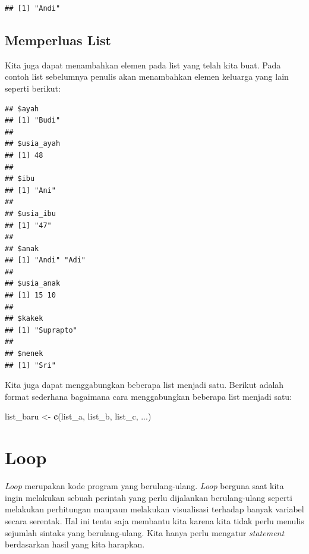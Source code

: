 \documentclass[]{book}
\newenvironment{Shaded}{\begin{snugshade}}{\end{snugshade}}
\newcommand{\KeywordTok}[1]{\textcolor[rgb]{0.13,0.29,0.53}{\textbf{#1}}}
\newcommand{\StringTok}[1]{\textcolor[rgb]{0.31,0.60,0.02}{#1}}
\newcommand{\CommentTok}[1]{\textcolor[rgb]{0.56,0.35,0.01}{\textit{#1}}}
\newcommand{\OperatorTok}[1]{\textcolor[rgb]{0.81,0.36,0.00}{\textbf{#1}}}
\newcommand{\NormalTok}[1]{#1}
\begin{document}
\begin{verbatim}
## [1] "Andi"
\end{verbatim}

\subsection{Memperluas List}\label{memperluas-list}

Kita juga dapat menambahkan elemen pada list yang telah kita buat. Pada
contoh list sebelumnya penulis akan menambahkan elemen keluarga yang
lain seperti berikut:

\begin{Shaded}
\end{Shaded}

\begin{verbatim}
## $ayah
## [1] "Budi"
## 
## $usia_ayah
## [1] 48
## 
## $ibu
## [1] "Ani"
## 
## $usia_ibu
## [1] "47"
## 
## $anak
## [1] "Andi" "Adi" 
## 
## $usia_anak
## [1] 15 10
## 
## $kakek
## [1] "Suprapto"
## 
## $nenek
## [1] "Sri"
\end{verbatim}

Kita juga dapat menggabungkan beberapa list menjadi satu. Berikut adalah
format sederhana bagaimana cara menggabungkan beberapa list menjadi
satu:

\begin{Shaded}
\begin{Highlighting}[]
\NormalTok{list_baru <-}\StringTok{ }\KeywordTok{c}\NormalTok{(list_a, list_b, list_c, ...)}
\end{Highlighting}
\end{Shaded}

\section{Loop}\label{loop}

\emph{Loop} merupakan kode program yang berulang-ulang. \emph{Loop}
berguna saat kita ingin melakukan sebuah perintah yang perlu dijalankan
berulang-ulang seperti melakukan perhitungan maupaun melakukan
visualisasi terhadap banyak variabel secara serentak. Hal ini tentu saja
membantu kita karena kita tidak perlu menulis sejumlah sintaks yang
berulang-ulang. Kita hanya perlu mengatur \emph{statement} berdasarkan
hasil yang kita harapkan.
\end{document}
